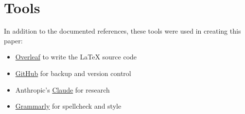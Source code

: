 %
%

\pagebreak
\section*{Tools}


\onehalfspacing

In addition to the documented references, these tools were used in creating this paper:

\begin{itemize}
    \item \href{http://www.overleaf.com}{Overleaf} to write the LaTeX source code
    \item \href{https://github.com/chfrank-cgn}{GitHub} for backup and version control
    \item Anthropic's \href{https://www.anthropic.com/claude}{Claude} for research
    \item \href{https://app.grammarly.com/}{Grammarly} for spellcheck and style
\end{itemize}
